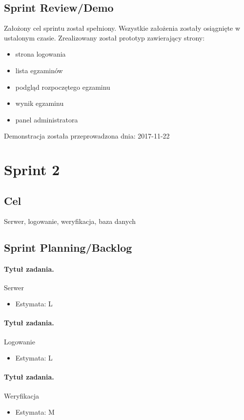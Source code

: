 \documentclass[a4paper]{article}
\begin{document}
\subsection{Sprint Review/Demo}
Założony cel sprintu został spełniony. Wszystkie założenia zostały osiągnięte w ustalonym czasie. Zrealizowany został prototyp zawierający strony:
\begin{itemize}
\item strona logowania
\item lista egzaminów
\item podgląd rozpoczętego egzaminu
\item wynik egzaminu 
\item panel administratora
\end{itemize}

Demonstracja została przeprowadzona dnia: 2017-11-22

\section{Sprint 2}

\subsection{Cel} Serwer, logowanie, weryfikacja, baza danych

\subsection{Sprint Planning/Backlog}

\paragraph{Tytuł zadania.} Serwer
\begin{itemize}
\item Estymata: L
\end{itemize}

\paragraph{Tytuł zadania.} Logowanie
\begin{itemize}
\item Estymata: L
\end{itemize}

\paragraph{Tytuł zadania.} Weryfikacja
\begin{itemize}
\item Estymata: M
\end{itemize}
\end{document}
